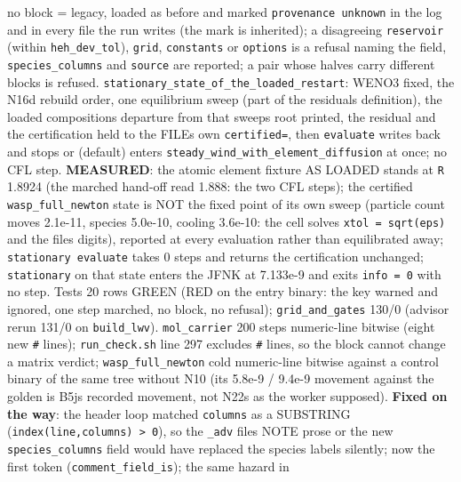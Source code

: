 \documentclass[english,a4paper]{my_memo}
\begin{document}
\begin{itemize}
  no block = legacy, loaded as before and marked \texttt{provenance\ unknown} in the
  log and in every file the run writes (the mark is inherited); a
  disagreeing \texttt{reservoir} (within \texttt{heh\_dev\_tol}), \texttt{grid}, \texttt{constants} or
  \texttt{options} is a refusal naming the field, \texttt{species\_columns} and \texttt{source}
  are reported; a pair whose halves carry different blocks is refused.
  \texttt{stationary\_state\_of\_the\_loaded\_restart}: WENO3 fixed, the N16d rebuild
  order, one equilibrium sweep (part of the residual\textquotesingle s definition), the
  loaded composition\textquotesingle s departure from that sweep\textquotesingle s root printed, the
  residual and the certification held to the FILE\textquotesingle s own \texttt{certified=}, then
  \texttt{evaluate} writes back and stops or (default) enters
  \texttt{steady\_wind\_with\_element\_diffusion} at once; no CFL step. \textbf{MEASURED}:
  the atomic element fixture AS LOADED stands at \texttt{\textbar{}\textbar{}R\textbar{}\textbar{}} 1.8924 (the marched
  hand-off read 1.888: the two CFL steps); the certified \texttt{wasp\_full\_newton}
  state is NOT the fixed point of its own sweep (particle count moves 2.1e-11,
  species 5.0e-10, cooling 3.6e-10: the cell solve\textquotesingle s \texttt{xtol\ =\ sqrt(eps)} and
  the file\textquotesingle s digits), reported at every evaluation rather than equilibrated
  away; \texttt{stationary\ evaluate} takes 0 steps and returns the certification
  unchanged; \texttt{stationary} on that state enters the JFNK at 7.133e-9 and
  exits \texttt{info\ =\ 0} with no step. Tests 20 rows GREEN (RED on the entry
  binary: the key warned and ignored, one step marched, no block, no
  refusal); \texttt{grid\_and\_gates} 130/0 (advisor rerun 131/0 on \texttt{build\_lwv}).
  \texttt{mol\_carrier} 200 steps numeric-line bitwise (eight new \texttt{\#} lines);
  \texttt{run\_check.sh} line 297 excludes \texttt{\#} lines, so the block cannot change a
  matrix verdict; \texttt{wasp\_full\_newton} cold numeric-line bitwise against a
  control binary of the same tree without N10 (its 5.8e-9 / 9.4e-9 movement
  against the golden is B5j\textquotesingle s recorded movement, not N22\textquotesingle s as the worker
  supposed). \textbf{Fixed on the way}: the header loop matched \texttt{columns} as a
  SUBSTRING (\texttt{index(line,\textquotesingle{}columns\textquotesingle{})\ \textgreater{}\ 0}), so the \texttt{\_adv} files\textquotesingle{} NOTE prose or
  the new \texttt{species\_columns} field would have replaced the species labels
  silently; now the first token (\texttt{comment\_field\_is}); the same hazard in

\end{itemize}
\end{document}
